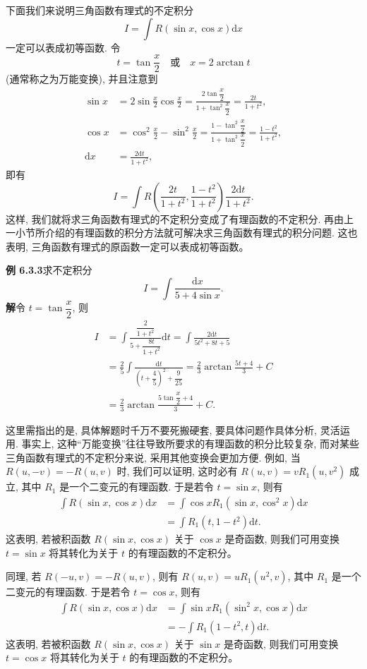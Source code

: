 \documentclass[UTF8, 12pt, fontset=fandol, oneside]{ctexart}
\begin{document}
下面我们来说明三角函数有理式的不定积分
\[
  I=\int R(\sin x,\cos x)\mathrm dx
\]
一定可以表成初等函数. 令
\[
  t=\tan\frac x2\quad\text{或}\quad x=2\arctan t
\]
(通常称之为万能变换), 并且注意到
\[
\begin{aligned}
  \sin x
  &=
  2\sin\frac x2\cos\frac x2
  =
  \frac{2\tan\dfrac x2}{1+\tan^2\dfrac x2}
  =
  \frac{2t}{1+t^2},\\
  \cos x
  &=
  \cos^2\frac x2-\sin^2\frac x2
  =
  \frac{1-\tan^2\dfrac x2}{1+\tan^2\dfrac x2}
  =
  \frac{1-t^2}{1+t^2},\\
  \mathrm dx&=\frac{2\mathrm dt}{1+t^2},
\end{aligned}
\]
即有
\[
  I=
  \int R\left(\frac{2t}{1+t^2},\frac{1-t^2}{1+t^2}\right)
  \frac{2\mathrm dt}{1+t^2}.
\]
这样, 我们就将求三角函数有理式的不定积分变成了有理函数的不定积分. 再由上一小节所介绍的有理函数的积分方法就可解决求三角函数有理式的积分问题. 这也表明, 三角函数有理式的原函数一定可以表成初等函数。

\noindent\textbf{例 6.3.3}\quad 求不定积分
\[
  I=\int\frac{\mathrm dx}{5+4\sin x}.
\]
\noindent\textbf{解}\quad 令 $t=\tan\dfrac x2$, 则
\[
\begin{aligned}
  I
  &=
  \int\frac{\dfrac2{1+t^2}}{5+\dfrac{8t}{1+t^2}}\mathrm dt
  =
  \int\frac{2\mathrm dt}{5t^2+8t+5}\\
  &=
  \frac25\int\frac{\mathrm dt}{\left(t+\dfrac45\right)^2+\dfrac9{25}}
  =
  \frac23\arctan\frac{5t+4}3+C\\
  &=
  \frac23\arctan\frac{5\tan\dfrac x2+4}3+C.
\end{aligned}
\]

这里需指出的是, 具体解题时千万不要死搬硬套, 要具体问题作具体分析, 灵活运用. 事实上, 这种``万能变换''往往导致所要求的有理函数的积分比较复杂, 而对某些三角函数有理式的不定积分来说, 采用其他变换会更加方便. 例如, 当 $R(u,-v)=-R(u,v)$ 时, 我们可以证明, 这时必有 $R(u,v)=vR_1(u,v^2)$ 成立, 其中 $R_1$ 是一个二变元的有理函数. 于是若令 $t=\sin x$, 则有
\[
\begin{aligned}
  \int R(\sin x,\cos x)\mathrm dx
  &=
  \int\cos xR_1(\sin x,\cos^2x)\mathrm dx\\
  &=
  \int R_1(t,1-t^2)\mathrm dt.
\end{aligned}
\]
这表明, 若被积函数 $R(\sin x,\cos x)$ 关于 $\cos x$ 是奇函数, 则我们可用变换 $t=\sin x$ 将其转化为关于 $t$ 的有理函数的不定积分。

同理, 若 $R(-u,v)=-R(u,v)$, 则有 $R(u,v)=uR_1(u^2,v)$, 其中 $R_1$ 是一个二变元的有理函数. 于是若令 $t=\cos x$, 则有
\[
\begin{aligned}
  \int R(\sin x,\cos x)\mathrm dx
  &=
  \int\sin xR_1(\sin^2x,\cos x)\mathrm dx\\
  &=
  -\int R_1(1-t^2,t)\mathrm dt.
\end{aligned}
\]
这表明, 若被积函数 $R(\sin x,\cos x)$ 关于 $\sin x$ 是奇函数, 则我们可用变换 $t=\cos x$ 将其转化为关于 $t$ 的有理函数的不定积分。
\end{document}
